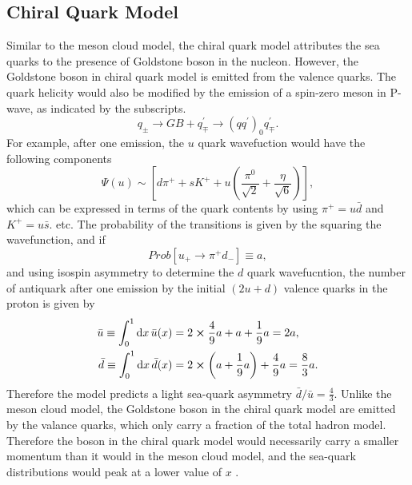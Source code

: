 \documentclass[../main.tex]{subfiles}
\begin{document}
\subsection{Chiral Quark Model}
Similar to the meson cloud model, the chiral quark model \cite{li1998} attributes the sea quarks to
the presence of Goldstone boson in the nucleon. However, the Goldstone boson in chiral quark model
is emitted from the valence quarks. The quark helicity would also be modified by the emission of a
spin-zero meson in P-wave, as indicated by the subscripts.
\begin{equation}
	q_{\pm} \rightarrow GB + q^\prime_\mp \rightarrow \left(q q^\prime\right)_0 q_{\mp}^\prime.
\end{equation}
For example, after one emission, the $u$ quark wavefuction would have the following components
\begin{equation}
	\Psi\left(u\right) \sim \left[d\pi^+ + s K^+ + u \left(\frac{\pi^0}{\sqrt{2}} + \frac{\eta}{\sqrt{6}}\right)\right],
\end{equation}
which can be expressed in terms of the quark contents by using $\pi^+ = u\bar{d}$ and $K^+ = u\bar{s}$. etc.
The probability of the transitions is given by the squaring the wavefunction, and if
\begin{equation}
	Prob\left[ u_+ \rightarrow \pi^+d_-\right] \equiv a,
\end{equation}
and using isospin asymmetry to determine the $d$ quark wavefucntion, the number of antiquark after one emission
by the initial $(2u+d)$ valence quarks in the proton is given by
\begin{equation}
	\begin{aligned}
		\bar{u} \equiv \int^1_0 \dd{x}\bar{u}(x) & = 2\cross\frac{4}{9}a +a+\frac{1}{9}a = 2a,                         \\
		\bar{d} \equiv \int^1_0 \dd{x}\bar{d}(x) & = 2\cross\left(a+\frac{1}{9}a\right) + \frac{4}{9}a = \frac{8}{3}a.
	\end{aligned}
\end{equation}
Therefore the model predicts a light sea-quark asymmetry $\bar{d}/\bar{u} =\frac{4}{3} $.
Unlike the meson cloud model, the Goldstone boson in the chiral quark model are emitted
by the valance quarks, which only carry a fraction of the total hadron model.
Therefore the boson in the chiral quark model would necessarily carry a smaller momentum than
it would in the meson cloud model, and the sea-quark distributions would peak at a lower value of $x$ \cite{antoniszczurek1996,peng1998}.
\end{document}

